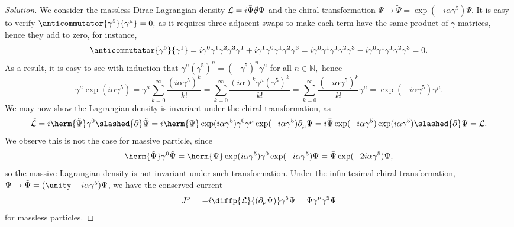 \begin{proof}[Solution]
   We consider the massless Dirac Lagrangian density \(\mathcal{L} = i\bar{\Psi} \slashed{\partial} \Psi\) and the chiral transformation \(\Psi \to \tilde{\Psi} = \exp(-i \alpha \gamma^5) \Psi.\)
   It is easy to verify \(\anticommutator{\gamma^5}{\gamma^\mu} = 0,\) as it requires three adjacent swaps to make each term have the same product of \(\gamma\) matrices, hence they add to zero, for instance,
   \begin{equation*}
      \anticommutator{\gamma^5}{\gamma^1} = i \gamma^0 \gamma^1 \gamma^2 \gamma^3 \gamma^1 + i \gamma^1 \gamma^0 \gamma^1 \gamma^2 \gamma^3 = i \gamma^0 \gamma^1 \gamma^1 \gamma^2 \gamma^3 - i \gamma^0 \gamma^1\gamma^1 \gamma^2 \gamma^3 = 0.
   \end{equation*}
   As a result, it is easy to see with induction that \(\gamma^\mu (\gamma^5)^n = (-\gamma^5)^n\gamma^\mu\) for all \(n \in \mathbb{N},\) hence
   \begin{equation*}
      \gamma^\mu \exp(i \alpha \gamma^5) = \gamma^\mu \sum_{k = 0}^{\infty} \frac{(i \alpha \gamma^5)^k}{k!} = \sum_{k = 0}^{\infty} \frac{(i \alpha)^k \gamma^\mu (\gamma^5)^k}{k!} = \sum_{k=0}^\infty \frac{(-i \alpha \gamma^5)^k}{k!} \gamma^\mu = \exp(-i \alpha \gamma^5) \gamma^\mu.
   \end{equation*}
   We may now show the Lagrangian density is invariant under the chiral transformation, as 
   \begin{equation*}
      \tilde{\mathcal{L}} = i\herm{\tilde{\Psi}} \gamma^0 \slashed{\partial} \tilde{\Psi} = i\herm{\Psi} \exp(i \alpha \gamma^5) \gamma^0 \gamma^\mu  \exp(-i \alpha \gamma^5) \partial_\mu\Psi = i\bar{\Psi} \exp(-i \alpha \gamma^5) \exp(i \alpha \gamma^5) \slashed{\partial} \Psi = \mathcal{L}.
   \end{equation*}
   We observe this is not the case for massive particle, since
   \begin{equation*}
       \herm{\tilde{\Psi}}\gamma^0 \tilde{\Psi} = \herm{\Psi} \exp(i \alpha \gamma^5) \gamma^0 \exp(-i \alpha \gamma^5) \Psi = \bar{\Psi} \exp(-2i \alpha \gamma^5) \Psi,
   \end{equation*}
   so the massive Lagrangian density is not invariant under such transformation. Under the infinitesimal chiral transformation, \(\Psi \to \tilde{\Psi} = (\unity - i \alpha \gamma^5)\Psi\), we have the conserved current
   \begin{equation*}
      J^\nu = -i \diffp{\mathcal{L}}{(\partial_\nu\Psi)} \gamma^5\Psi = \bar{\Psi} \gamma^\nu \gamma^5\Psi
   \end{equation*}
   for massless particles.
\end{proof}
